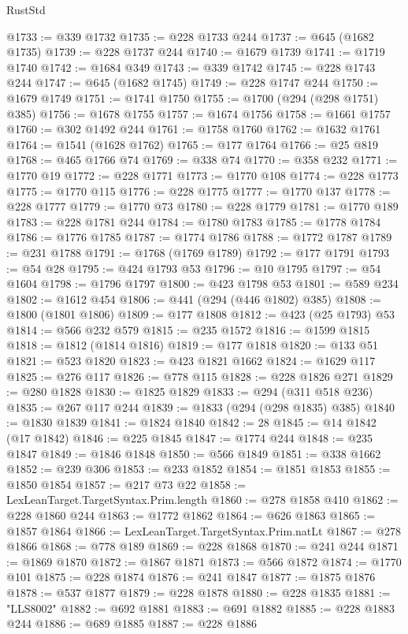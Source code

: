 \begin{lexlean}{RustStd}
\begin{coremodule}
@1733 := @339 @1732
@1735 := @228 @1733 @244
@1737 := @645 (@1682 @1735)
@1739 := @228 @1737 @244
@1740 := @1679 @1739
@1741 := @1719 @1740
@1742 := @1684 @349
@1743 := @339 @1742
@1745 := @228 @1743 @244
@1747 := @645 (@1682 @1745)
@1749 := @228 @1747 @244
@1750 := @1679 @1749
@1751 := @1741 @1750
@1755 := @1700 (@294 (@298 @1751) @385)
@1756 := @1678 @1755
@1757 := @1674 @1756
@1758 := @1661 @1757
@1760 := @302 @1492 @244
@1761 := @1758 @1760
@1762 := @1632 @1761
@1764 := @1541 (@1628 @1762)
@1765 := @177 @1764
@1766 := @25 @819
@1768 := @465 @1766 @74
@1769 := @338 @74
@1770 := @358 @232
@1771 := @1770 @19
@1772 := @228 @1771
@1773 := @1770 @108
@1774 := @228 @1773
@1775 := @1770 @115
@1776 := @228 @1775
@1777 := @1770 @137
@1778 := @228 @1777
@1779 := @1770 @73
@1780 := @228 @1779
@1781 := @1770 @189
@1783 := @228 @1781 @244
@1784 := @1780 @1783
@1785 := @1778 @1784
@1786 := @1776 @1785
@1787 := @1774 @1786
@1788 := @1772 @1787
@1789 := @231 @1788
@1791 := @1768 (@1769 @1789)
@1792 := @177 @1791
@1793 := @54 @28
@1795 := @424 @1793 @53
@1796 := @10 @1795
@1797 := @54 @1604
@1798 := @1796 @1797
@1800 := @423 @1798 @53
@1801 := @589 @234
@1802 := @1612 @454
@1806 := @441 (@294 (@446 @1802) @385)
@1808 := @1800 (@1801 @1806)
@1809 := @177 @1808
@1812 := @423 (@25 @1793) @53
@1814 := @566 @232 @579
@1815 := @235 @1572
@1816 := @1599 @1815
@1818 := @1812 (@1814 @1816)
@1819 := @177 @1818
@1820 := @133 @51
@1821 := @523 @1820
@1823 := @423 @1821 @1662
@1824 := @1629 @117
@1825 := @276 @117
@1826 := @778 @115
@1828 := @228 @1826 @271
@1829 := @280 @1828
@1830 := @1825 @1829
@1833 := @294 (@311 @518 @236)
@1835 := @267 @117 @244
@1839 := @1833 (@294 (@298 @1835) @385)
@1840 := @1830 @1839
@1841 := @1824 @1840
@1842 := 28
@1845 := @14 @1842 (@17 @1842)
@1846 := @225 @1845
@1847 := @1774 @244
@1848 := @235 @1847
@1849 := @1846 @1848
@1850 := @566 @1849
@1851 := @338 @1662
@1852 := @239 @306
@1853 := @233 @1852
@1854 := @1851 @1853
@1855 := @1850 @1854
@1857 := @217 @73 @22
@1858 := LexLeanTarget.TargetSyntax.Prim.length
@1860 := @278 @1858 @410
@1862 := @228 @1860 @244
@1863 := @1772 @1862
@1864 := @626 @1863
@1865 := @1857 @1864
@1866 := LexLeanTarget.TargetSyntax.Prim.natLt
@1867 := @278 @1866
@1868 := @778 @189
@1869 := @228 @1868
@1870 := @241 @244
@1871 := @1869 @1870
@1872 := @1867 @1871
@1873 := @566 @1872
@1874 := @1770 @101
@1875 := @228 @1874
@1876 := @241 @1847
@1877 := @1875 @1876
@1878 := @537 @1877
@1879 := @228 @1878
@1880 := @228 @1835
@1881 := "LLS8002"
@1882 := @692 @1881
@1883 := @691 @1882
@1885 := @228 @1883 @244
@1886 := @689 @1885
@1887 := @228 @1886

\end{coremodule}
\end{lexlean}
